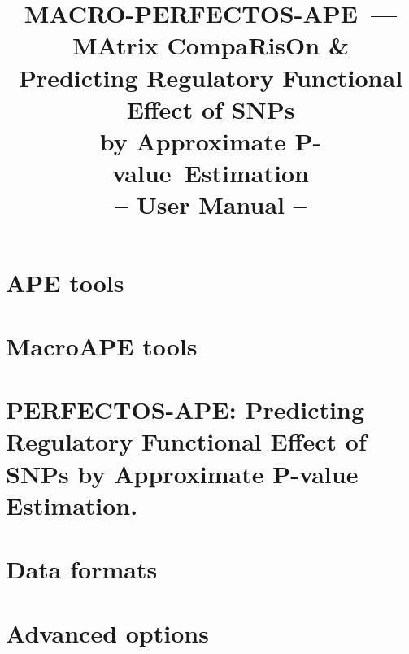 \documentclass[draft]{article}
\newcommand*{\pvalue}{\mbox{P-value}}
\begin{document}
\title{
MACRO-PERFECTOS-APE~---\\{\small MAtrix CompaRisOn \&\\ Predicting Regulatory Functional Effect of SNPs\\ by Approximate \pvalue\ Estimation}\\
-- User Manual --
}
\maketitle








\section{APE tools}







\section{MacroAPE tools}






\section{PERFECTOS-APE: Predicting Regulatory Functional Effect of SNPs by Approximate P-value Estimation.}





\section{Data formats}




\section{Advanced options}

\end{document}
